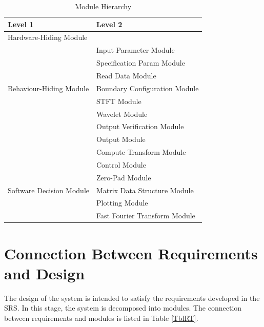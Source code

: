 \documentclass[12pt, titlepage]{article}
\begin{document}
\begin{table}[h!]
\centering
\begin{tabular}{p{} p{}}
\toprule
\textbf{Level 1} & \textbf{Level 2}\\
\midrule

{Hardware-Hiding Module} & ~ \\
\midrule

\multirow{7}{0.3\textwidth}{Behaviour-Hiding Module} &  Input Parameter Module\\
& Specification Param Module \\
& Read Data Module\\
& Boundary Configuration Module \\
& STFT Module\\
& Wavelet Module\\
& Output Verification Module\\
& Output Module\\
& Compute Transform Module \\ 
& Control Module\\
\midrule

\multirow{3}{0.3\textwidth}{Software Decision Module} & { Zero-Pad Module}\\
& Matrix Data Structure Module\\ 
& Plotting Module\\
& Fast Fourier Transform Module\\
\bottomrule

\end{tabular}
\caption{Module Hierarchy}
\label{TblMH}
\end{table}

\section{Connection Between Requirements and Design} \label{SecConnection}

The design of the system is intended to satisfy the requirements developed in
the SRS. In this stage, the system is decomposed into modules. The connection
between requirements and modules is listed in Table \ref{TblRT}.

\end{document}

